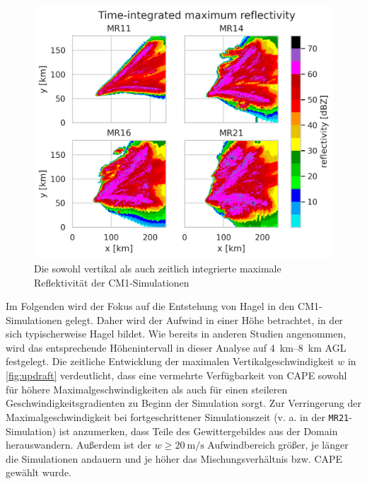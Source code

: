 \begin{figure}
	\centering
	\includegraphics[width=0.8\linewidth]{../figs/cref.png}
	\caption{Die sowohl vertikal als auch zeitlich integrierte maximale Reflektivität der CM1-Simulationen}
	\label{fig:cref}
\end{figure}

Im Folgenden wird der Fokus auf die Entstehung von Hagel in den CM1-Simulationen gelegt. Daher wird der Aufwind in einer Höhe betrachtet, in der sich typischerweise Hagel bildet. Wie bereits in anderen Studien \parencite{lin2022} angenommen, wird das entsprechende Höhenintervall in dieser Analyse auf \SIrange{4}{8}{\km} AGL festgelegt. Die zeitliche Entwicklung der maximalen Vertikalgeschwindigkeit \(w\) in \cref{fig:updraft} verdeutlicht, dass eine vermehrte Verfügbarkeit von CAPE sowohl für höhere Maximalgeschwindigkeiten als auch für einen steileren Geschwindigkeitsgradienten zu Beginn der Simulation sorgt. Zur Verringerung der Maximalgeschwindigkeit bei fortgeschrittener Simulationszeit (v. a. in der \texttt{MR21}-Simulation) ist anzumerken, dass Teile des Gewittergebildes aus der Domain herauswandern. Außerdem ist der \(w \geq \SI{20}{\m\per\s}\) Aufwindbereich größer, je länger die Simulationen andauern und je höher das Mischungsverhältnis bzw. CAPE gewählt wurde.

